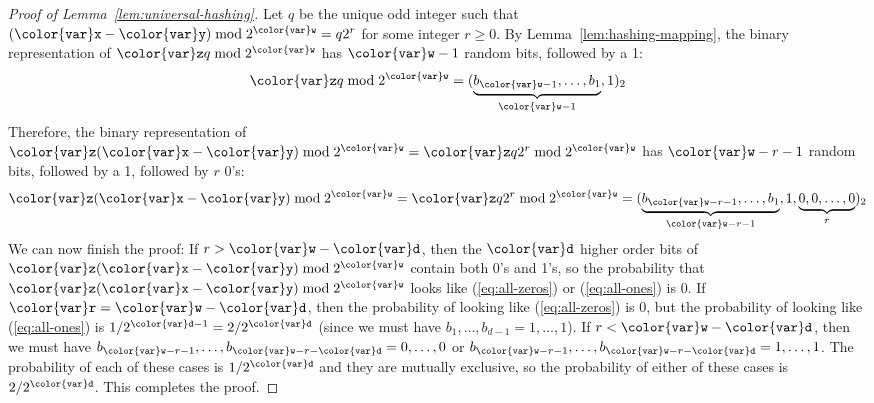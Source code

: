 \documentclass[10pt]{book}
\newcommand{\myeqref}[1]{(\ref{eq:#1})}
\theoremstyle{plain}
\newcommand{\lemref}[1]{Lemma~\ref{lem:#1}}
\theoremstyle{definition}
\begin{document}
\begin{proof}[Proof of \lemref{universal-hashing}]
  Let $q$ be the unique odd integer such that $(\ensuremath{\mathtt{{\color{var}x}}}-\ensuremath{\mathtt{{\color{var}y}}})\bmod
  2^{\ensuremath{\mathtt{{\color{var}w}}}}=q2^r$ for some integer $r\ge 0$. By
  \lemref{hashing-mapping}, the binary representation of $\ensuremath{\mathtt{{\color{var}z}}}q\bmod
  2^{\ensuremath{\mathtt{{\color{var}w}}}}$ has $\ensuremath{\mathtt{{\color{var}w}}}-1$ random bits, followed by a 1:
  \[
   \ensuremath{\mathtt{{\color{var}z}}}q\bmod 2^{\ensuremath{\mathtt{{\color{var}w}}}}  = (\underbrace{b_{\ensuremath{\mathtt{{\color{var}w}}}-1},\ldots,b_{1}}_{\ensuremath{\mathtt{{\color{var}w}}}-1},1)_2
  \]
  Therefore, the binary representation of $\ensuremath{\mathtt{{\color{var}z}}}(\ensuremath{\mathtt{{\color{var}x}}}-\ensuremath{\mathtt{{\color{var}y}}})\bmod 2^{\ensuremath{\mathtt{{\color{var}w}}}}=\ensuremath{\mathtt{{\color{var}z}}}q2^r\bmod 2^{\ensuremath{\mathtt{{\color{var}w}}}}$ has
  $\ensuremath{\mathtt{{\color{var}w}}}-r-1$ random bits, followed by a 1, followed by $r$ 0's:
  \[
  \ensuremath{\mathtt{{\color{var}z}}}(\ensuremath{\mathtt{{\color{var}x}}}-\ensuremath{\mathtt{{\color{var}y}}})\bmod 2^{\ensuremath{\mathtt{{\color{var}w}}}}  =
  \ensuremath{\mathtt{{\color{var}z}}}q2^{r}\bmod 2^{\ensuremath{\mathtt{{\color{var}w}}}} =
      (\underbrace{b_{\ensuremath{\mathtt{{\color{var}w}}}-r-1},\ldots,b_{1}}_{\ensuremath{\mathtt{{\color{var}w}}}-r-1},1,\underbrace{0,0,\ldots,0}_{r})_2
  \]
  We can now finish the proof:  If $r > \ensuremath{\mathtt{{\color{var}w}}}-\ensuremath{\mathtt{{\color{var}d}}}$, then the \ensuremath{\mathtt{{\color{var}d}}}
  higher order bits of $\ensuremath{\mathtt{{\color{var}z}}}(\ensuremath{\mathtt{{\color{var}x}}}-\ensuremath{\mathtt{{\color{var}y}}})\bmod 2^{\ensuremath{\mathtt{{\color{var}w}}}}$  contain both 0's
  and 1's, so the probability that $\ensuremath{\mathtt{{\color{var}z}}}(\ensuremath{\mathtt{{\color{var}x}}}-\ensuremath{\mathtt{{\color{var}y}}})\bmod 2^{\ensuremath{\mathtt{{\color{var}w}}}}$ looks
  like \myeqref{all-zeros} or \myeqref{all-ones} is 0.  If $\ensuremath{\mathtt{{\color{var}r}}}=\ensuremath{\mathtt{{\color{var}w}}}-\ensuremath{\mathtt{{\color{var}d}}}$,
  then the probability of looking like \myeqref{all-zeros} is 0, but the
  probability of looking like \myeqref{all-ones} is $1/2^{\ensuremath{\mathtt{{\color{var}d}}}-1}=2/2^{\ensuremath{\mathtt{{\color{var}d}}}}$
  (since we must have $b_1,\ldots,b_{d-1}=1,\ldots,1$).  If $r < \ensuremath{\mathtt{{\color{var}w}}}-\ensuremath{\mathtt{{\color{var}d}}}$,
  then we must have $b_{\ensuremath{\mathtt{{\color{var}w}}}-r-1},\ldots,b_{\ensuremath{\mathtt{{\color{var}w}}}-r-\ensuremath{\mathtt{{\color{var}d}}}}=0,\ldots,0$ or
  $b_{\ensuremath{\mathtt{{\color{var}w}}}-r-1},\ldots,b_{\ensuremath{\mathtt{{\color{var}w}}}-r-\ensuremath{\mathtt{{\color{var}d}}}}=1,\ldots,1$.  The probability of each
  of these cases is $1/2^{\ensuremath{\mathtt{{\color{var}d}}}}$ and they are mutually exclusive, so the
  probability of either of these cases is $2/2^{\ensuremath{\mathtt{{\color{var}d}}}}$.  This completes
  the proof.
\end{proof}
\end{document}
